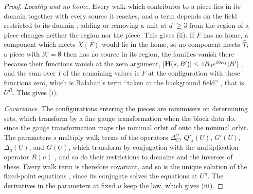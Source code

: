 \documentclass[11pt]{preprint}
\DeclarePairedDelimiter{\abs}{\lvert}{\rvert}
\numberwithin{equation}{section}
\theoremstyle{definition}
\theoremstyle{remark}
\theoremstyle{plain}
\begin{document}
\begin{proof}
\emph{Locality and no home.} Every walk which contributes to a piece lies in its domain together with every source it reaches, and a term depends on the field restricted to its domain \cite[p.~374, ll.~29--33]{BalabanLFR2}; adding or removing a unit at $d_\square \geq 3$ from the region of a piece changes neither the region nor the piece. This gives (ii). If $F$ has no home, a component which meets $X(F)$ would lie in the home, so no component meets $\hat T$; a piece with $\mathcal K = \emptyset$ then has no source in its region, the families vanish there because their functions vanish at the zero argument, $\abs{\mathbf H(s, B')} \leq 4B_0e^{16\kappa_1}\abs{B'}$ \cite[(1.18)]{BalabanRG2}, and the sum over $I$ of the remaining values is $F$ at the configuration with these functions zero, which is Ba{\l}aban's term ``taken at the background field'' \cite[p.~373, ll.~5--6]{BalabanLFR2}, that is $U^R$. This gives (i).

\emph{Covariance.} The configurations entering the pieces are minimisers on determining sets, which transform by a fine gauge transformation when the block data do, since the gauge transformation maps the minimal orbit of \cite[(2.12)]{BalabanCRE} onto the minimal orbit. The parameters $s$ multiply walk terms of the operators $\Delta^\eta_U$, $Q'_j(U)$, $G'(U)$, $\Delta_a(U)$, and $G(U)$, which transform by conjugation with the multiplication operator $R(u)$ \cite[(3.28)--(3.34), pp.~395--396]{BalabanPBG}, and so do their restrictions to domains and the inverses of these. Every walk term is therefore covariant, and so is the unique solution of the fixed-point equations \cite[(1.3)--(1.4), pp.~5--6]{BalabanRG2}, since its conjugate solves the equations at $U^u$. The derivatives in the parameters at fixed $u$ keep the law, which gives (iii).


\end{proof}
\end{document}
